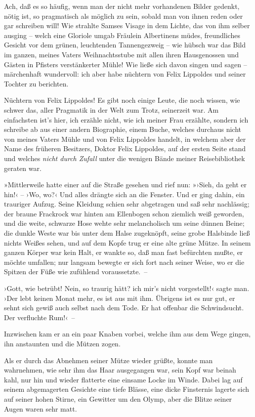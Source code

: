 Ach, daß es so häufig, wenn man der nicht mehr vorhandenen Bilder
gedenkt, nötig ist, so pragmatisch als möglich zu sein, sobald man
von ihnen reden oder gar schreiben will! Wie strahlte Samses Visage
in dem Lichte, das von ihm selber ausging – welch eine Gloriole
umgab Fräulein Albertinens müdes, freundliches Gesicht vor dem
grünen, leuchtenden Tannengezweig – wie hübsch war das Bild im
ganzen, meines Vaters Weihnachtsstube mit allen ihren Hausgenossen
und Gästen in Pfisters verstänkerter Mühle! Wie ließe sich davon
singen und sagen – märchenhaft wundervoll: ich aber habe nüchtern
von Felix Lippoldes und seiner Tochter zu berichten.

Nüchtern von Felix Lippoldes! Es gibt noch einige Leute, die noch
wissen, wie schwer das, aller Pragmatik in der Welt zum Trotz,
seinerzeit war. Am einfachsten ist's hier, ich erzähle nicht, wie
ich meiner Frau erzählte, sondern ich schreibe ab aus einer andern
Biographie, einem Buche, welches durchaus nicht von meines Vaters
Mühle und von Felix Lippoldes handelt, in welchem aber der Name des
früheren Besitzers, Doktor Felix Lippoldes, auf der ersten Seite
stand und welches \emph{nicht durch Zufall} unter die wenigen Bände
meiner Reisebibliothek geraten war.

»Mittlerweile hatte einer auf die Straße gesehen und rief nun:
»›Sieh, da geht er hin!‹ – ›Wo, wo?‹ Und alles drängte sich an die
Fenster. Und er ging dahin, ein trauriger Aufzug. Seine Kleidung
schien sehr abgetragen und saß sehr nachlässig; der braune
Frackrock war hinten am Ellenbogen schon ziemlich weiß geworden,
und die weite, schwarze Hose wehte sehr melancholisch um seine
dünnen Beine; die dunkle Weste war bis unter dem Halse zugeknöpft,
seine grobe Halsbinde ließ nichts Weißes sehen, und auf dem Kopfe
trug er eine alte grüne Mütze. In seinem ganzen Körper war kein
Halt, er wankte so, daß man fast befürchten mußte, er möchte
umfallen; nur langsam bewegte er sich fort nach seiner Weise, wo er
die Spitzen der Füße wie zufühlend voraussetzte.~–

›Gott, wie betrübt! Nein, so traurig hätt? ich mir's nicht
vorgestellt!‹ sagte man. ›Der lebt keinen Monat mehr, es ist aus
mit ihm. Übrigens ist es nur gut, er sehnt sich gewiß auch selbst
nach dem Tode. Er hat offenbar die Schwindsucht. Der verfluchte
Rum!‹~–

Inzwischen kam er an ein paar Knaben vorbei, welche ihm aus dem
Wege gingen, ihn anstaunten und die Mützen zogen.

Als er durch das Abnehmen seiner Mütze wieder grüßte, konnte man
wahrnehmen, wie sehr ihm das Haar ausgegangen war, sein Kopf war
beinah kahl, nur hin und wieder flatterte eine einsame Locke im
Winde. Dabei lag auf seinem abgemagerten Gesichte eine tiefe
Blässe, eine dicke Finsternis lagerte sich auf seiner hohen Stirne,
ein Gewitter um den Olymp, aber die Blitze seiner Augen waren sehr
matt.

